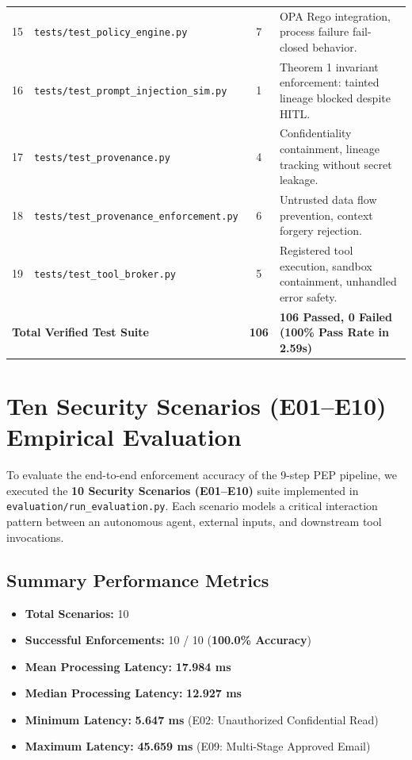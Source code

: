 \begin{table}[htbp]
\begin{tabularx}{\textwidth}{clcX}
15 & \texttt{tests/test\_policy\_engine.py} & 7 & OPA Rego integration, process failure fail-closed behavior. \\
16 & \texttt{tests/test\_prompt\_injection\_sim.py} & 1 & Theorem 1 invariant enforcement: tainted lineage blocked despite HITL. \\
17 & \texttt{tests/test\_provenance.py} & 4 & Confidentiality containment, lineage tracking without secret leakage. \\
18 & \texttt{tests/test\_provenance\_enforcement.py} & 6 & Untrusted data flow prevention, context forgery rejection. \\
19 & \texttt{tests/test\_tool\_broker.py} & 5 & Registered tool execution, sandbox containment, unhandled error safety. \\
\midrule
\multicolumn{2}{l}{\textbf{Total Verified Test Suite}} & \textbf{106} & \textbf{106 Passed, 0 Failed (100\% Pass Rate in 2.59s)} \\
\bottomrule
\end{tabularx}
\end{table}

\section{Ten Security Scenarios (E01--E10) Empirical Evaluation}
To evaluate the end-to-end enforcement accuracy of the 9-step PEP pipeline, we executed the \textbf{10 Security Scenarios (E01--E10)} suite implemented in \texttt{evaluation/run\_evaluation.py}. Each scenario models a critical interaction pattern between an autonomous agent, external inputs, and downstream tool invocations.

\subsection{Summary Performance Metrics}
\begin{itemize}
    \item \textbf{Total Scenarios:} 10
    \item \textbf{Successful Enforcements:} 10 / 10 (\textbf{100.0\% Accuracy})
    \item \textbf{Mean Processing Latency:} \textbf{17.984 ms}
    \item \textbf{Median Processing Latency:} \textbf{12.927 ms}
    \item \textbf{Minimum Latency:} \textbf{5.647 ms} (E02: Unauthorized Confidential Read)
    \item \textbf{Maximum Latency:} \textbf{45.659 ms} (E09: Multi-Stage Approved Email)
\end{itemize}

